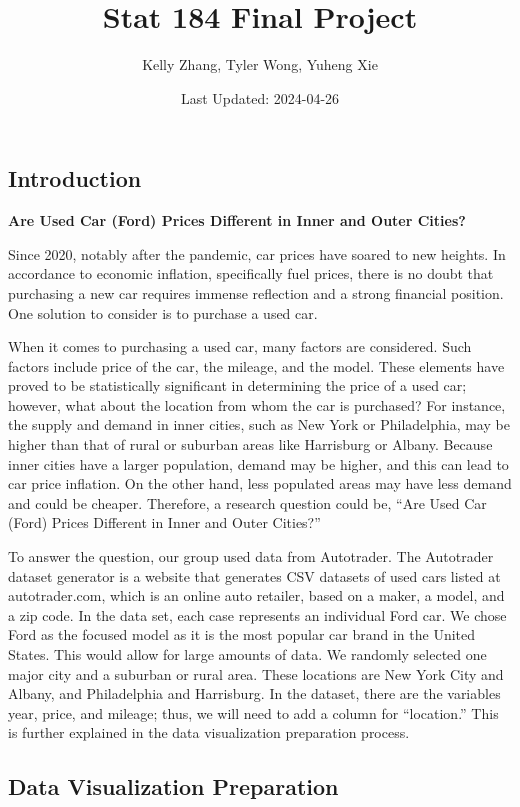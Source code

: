 \documentclass[
]{article}
\title{Stat 184 Final Project}
\author{Kelly Zhang, Tyler Wong, Yuheng Xie}
\date{Last Updated: 2024-04-26}
\begin{document}
\maketitle

\hypertarget{introduction}{%
\subsection{Introduction}\label{introduction}}

\textbf{Are Used Car (Ford) Prices Different in Inner and Outer Cities?}

Since 2020, notably after the pandemic, car prices have soared to new
heights. In accordance to economic inflation, specifically fuel prices,
there is no doubt that purchasing a new car requires immense reflection
and a strong financial position. One solution to consider is to purchase
a used car.

When it comes to purchasing a used car, many factors are considered.
Such factors include price of the car, the mileage, and the model. These
elements have proved to be statistically significant in determining the
price of a used car; however, what about the location from whom the car
is purchased? For instance, the supply and demand in inner cities, such
as New York or Philadelphia, may be higher than that of rural or
suburban areas like Harrisburg or Albany. Because inner cities have a
larger population, demand may be higher, and this can lead to car price
inflation. On the other hand, less populated areas may have less demand
and could be cheaper. Therefore, a research question could be, ``Are
Used Car (Ford) Prices Different in Inner and Outer Cities?''

To answer the question, our group used data from Autotrader. The
Autotrader dataset generator is a website that generates CSV datasets of
used cars listed at autotrader.com, which is an online auto retailer,
based on a maker, a model, and a zip code. In the data set, each case
represents an individual Ford car. We chose Ford as the focused model as
it is the most popular car brand in the United States. This would allow
for large amounts of data. We randomly selected one major city and a
suburban or rural area. These locations are New York City and Albany,
and Philadelphia and Harrisburg. In the dataset, there are the variables
year, price, and mileage; thus, we will need to add a column for
``location.'' This is further explained in the data visualization
preparation process.

\hypertarget{data-visualization-preparation}{%
\subsection{Data Visualization
Preparation}\label{data-visualization-preparation}}
\end{document}
